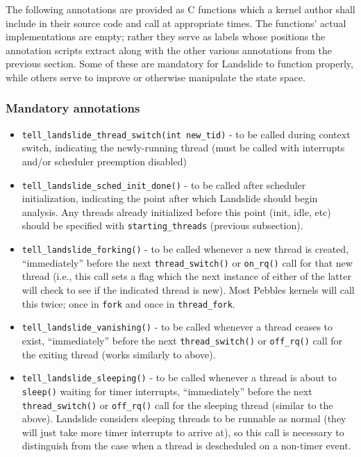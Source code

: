 The following annotations are provided as C functions
which a kernel author shall include in their source code and call at appropriate times.
The functions' actual implementations are empty;
rather they serve as labels whose positions the annotation scripts extract
along with the other various annotations from the previous section.
Some of these are mandatory for Landslide to function properly,
while others serve to improve or otherwise manipulate the state space.

\subsubsection{Mandatory annotations}

\begin{itemize}
	\item {\tt tell\_landslide\_thread\_switch(int new\_tid)} - to be called during context switch, indicating the newly-running thread
		(must be called with interrupts and/or scheduler preemption disabled)
	\item {\tt tell\_landslide\_sched\_init\_done()} - to be called after scheduler initialization,
		indicating the point after which Landslide should begin analysis.
		Any threads already initialized before this point (init, idle, etc) should be specified with {\tt starting\_threads} (previous subsection).
	\item {\tt tell\_landslide\_forking()} - to be called whenever a new thread is created,
		``immediately'' before the next {\tt thread\_switch()} or {\tt on\_rq()} call for that new thread (i.e., this call sets a flag which the next instance of either of the latter will check to see if the indicated thread is new).
		Most Pebbles kernels will call this twice; once in {\tt fork} and once in {\tt thread\_fork}.
	\item {\tt tell\_landslide\_vanishing()} - to be called whenever a thread ceases to exist,
		``immediately'' before the next {\tt thread\_switch()} or {\tt off\_rq()} call for the exiting thread
		(works similarly to above).
	\item {\tt tell\_landslide\_sleeping()} - to be called whenever a thread is about to {\tt sleep()} waiting for timer interrupts,
		``immediately'' before the next {\tt thread\_switch()} or {\tt off\_rq()} call for the sleeping thread
		(similar to the above).
		Landslide considers sleeping threads to be runnable as normal (they will just take more timer interrupts to arrive at),
		so this call is necessary to distinguish from the case when a thread is descheduled on a non-timer event.

\end{itemize}
